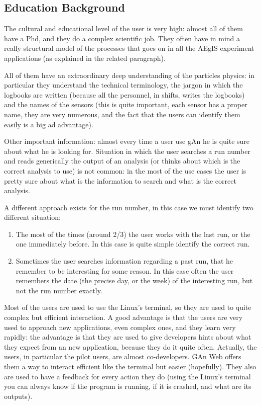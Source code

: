 \subsection{Education Background}
The cultural and educational level of the user is very high: almost all of them have a Phd, and they do a complex scientific job. They often have in mind a really structural model of the processes that goes on in all the AEgIS experiment applications (as explained in the related paragraph). 

All of them have an extraordinary deep understanding of the particles physics: in particular they understand the technical terminology, the jargon in which the logbooks are written (because all the personnel, in shifts, writes the logbooks) and the names of the sensors (this is quite important, each sensor has a proper name, they are very numerous, and the fact that the users can identify them easily is a big ad advantage). 

Other important information: almost every time a user use gAn he is quite sure about what he is looking for. Situation in which the user searches a run number and reads generically the output of an analysis (or thinks about which is the correct analysis to use) is not common: in the most of the use cases the user is pretty sure about what is the information to search and what is the correct analysis. 

A different approach exists for the run number, in this case we must identify two different situation:

\begin{enumerate}

\item The most of the times (around 2/3) the user works with the last run, or the one immediately before. In this case is quite simple identify the correct run.
\item Sometimes the user searches information regarding a past run, that he remember to be interesting for some reason. In this case often the user remembers the date (the precise day, or the week) of the interesting run, but not the run number exactly.

\end{enumerate}

Most of the users are used to use the Linux's terminal, so they are used to quite complex but efficient interaction. A good advantage is that the users are very used to approach new applications, even complex ones, and they learn very rapidly: the advantage is that they are used to give developers hints about what they expect from an new application, because they do it quite often. Actually, the users, in particular the pilot users, are almost co-developers. GAn Web offers them a way to interact efficient like the terminal but easier (hopefully). They also are used to have a feedback for every action they do (using the Linux's terminal you can always know if the program is running, if it is crashed, and what are its outputs).

